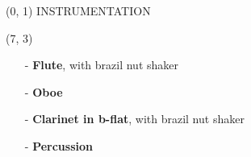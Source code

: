 \documentclass[10pt]{article}
\begin{document}
\begin{textblock}{23} (0, 1)
\center\huge INSTRUMENTATION
\end{textblock}

\begin{textblock}{9} (7, 3)

    \begin{itemize}

        \item[-] \textbf{Flute}, with brazil nut shaker \\

        \item[-] \textbf{Oboe} \\

        \item[-] \textbf{Clarinet in b-flat}, with brazil nut shaker \\

        \item[-] \textbf{Percussion} \\


\end{itemize}
\end{textblock}
\end{document}
